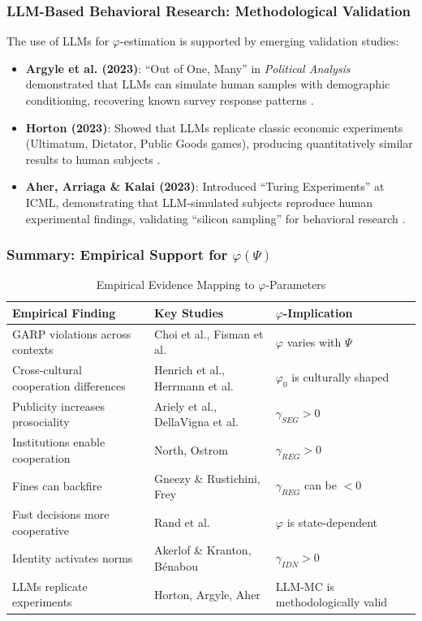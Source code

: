 \subsubsection{LLM-Based Behavioral Research: Methodological Validation}

The use of LLMs for $\varphi$-estimation is supported by emerging validation studies:

\begin{itemize}
\item \textbf{Argyle et al. (2023)}: ``Out of One, Many'' in \textit{Political Analysis} demonstrated that LLMs can simulate human samples with demographic conditioning, recovering known survey response patterns \cite{argyle2023}.

\item \textbf{Horton (2023)}: Showed that LLMs replicate classic economic experiments (Ultimatum, Dictator, Public Goods games), producing quantitatively similar results to human subjects \cite{horton2023}.

\item \textbf{Aher, Arriaga \& Kalai (2023)}: Introduced ``Turing Experiments'' at ICML, demonstrating that LLM-simulated subjects reproduce human experimental findings, validating ``silicon sampling'' for behavioral research \cite{aher2023}.
\end{itemize}

\subsubsection{Summary: Empirical Support for $\varphi(\Psi)$}

\begin{table}[htbp]
\centering
\caption{Empirical Evidence Mapping to $\varphi$-Parameters}
\label{tab:phi-evidence}
\renewcommand{\arraystretch}{1.3}
\begin{tabular}{@{}p{4.5cm}p{4cm}p{4cm}@{}}
\toprule
\textbf{Empirical Finding} & \textbf{Key Studies} & \textbf{$\varphi$-Implication} \\
\midrule
GARP violations across contexts & Choi et al., Fisman et al. & $\varphi$ varies with $\Psi$ \\
Cross-cultural cooperation differences & Henrich et al., Herrmann et al. & $\varphi_0$ is culturally shaped \\
Publicity increases prosociality & Ariely et al., DellaVigna et al. & $\gamma_{SEG} > 0$ \\
Institutions enable cooperation & North, Ostrom & $\gamma_{REG} > 0$ \\
Fines can backfire & Gneezy \& Rustichini, Frey & $\gamma_{REG}$ can be $< 0$ \\
Fast decisions more cooperative & Rand et al. & $\varphi$ is state-dependent \\
Identity activates norms & Akerlof \& Kranton, Bénabou & $\gamma_{IDN} > 0$ \\
LLMs replicate experiments & Horton, Argyle, Aher & LLM-MC is methodologically valid \\
\bottomrule
\end{tabular}
\end{table}



